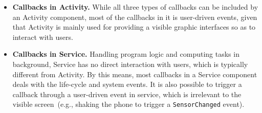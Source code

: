 \begin{itemize}
    \item \textbf{Callbacks in Activity.}  
        While all three types of callbacks can be included by an Activity component,             
        most of the callbacks in it is user-driven events, given that 
        Activity is mainly used for providing a visible graphic interfaces so as to interact with users. 
        


    \item \textbf{Callbacks in Service.} 
        Handling program logic and computing tasks in background, Service has no direct interaction with users, which is typically different from Activity. 
        By this means, most callbacks in a Service component deals with the life-cycle and system events. 
        It is also possible to trigger a callback through a user-driven event in service, which is irrelevant to the visible screen~(e.g., shaking the phone to trigger a \texttt{SensorChanged} event). 

        





\end{itemize}
